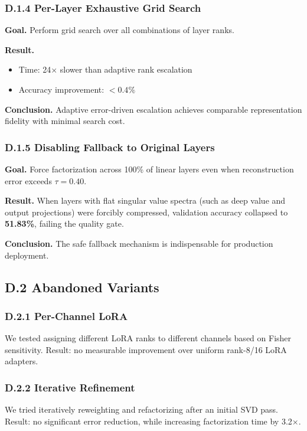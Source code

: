 \subsubsection{D.1.4 Per-Layer Exhaustive Grid Search}

\textbf{Goal.} Perform grid search over all combinations of layer ranks.

\textbf{Result.}
\begin{itemize}
\item Time: 24$\times$ slower than adaptive rank escalation
\item Accuracy improvement: $<0.4\%$
\end{itemize}
\textbf{Conclusion.} Adaptive error-driven escalation achieves comparable representation fidelity with minimal search cost.

\subsubsection{D.1.5 Disabling Fallback to Original Layers}

\textbf{Goal.} Force factorization across 100\% of linear layers even when reconstruction error exceeds $\tau = 0.40$.

\textbf{Result.} When layers with flat singular value spectra (such as deep value and output projections) were forcibly compressed, validation accuracy collapsed to \textbf{51.83\%}, failing the quality gate.

\textbf{Conclusion.} The safe fallback mechanism is indispensable for production deployment.

\subsection{D.2 Abandoned Variants}

\subsubsection{D.2.1 Per-Channel LoRA}

We tested assigning different LoRA ranks to different channels based on 
Fisher sensitivity. Result: no measurable improvement over uniform rank-8/16 LoRA adapters.

\subsubsection{D.2.2 Iterative Refinement}

We tried iteratively reweighting and refactorizing after an initial SVD pass. Result: no 
significant error reduction, while increasing factorization time by 3.2$\times$.

